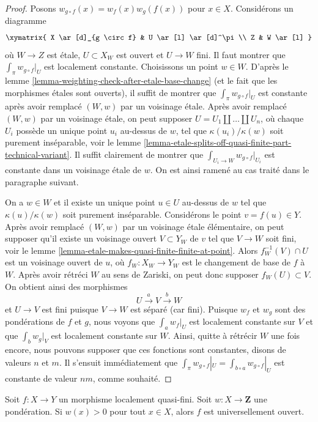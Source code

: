 \begin{proof}
Posons $w_{g \circ f}(x) = w_f(x) w_g(f(x))$ pour $x \in X$.
Considérons un diagramme
$$
\xymatrix{
X \ar[d]_{g \circ f} & U \ar[l] \ar[d]^\pi \\
Z & W \ar[l]
}
$$
où $W \to Z$ est \'etale, $U \subset X_W$ est ouvert et $U \to W$ fini.
Il faut montrer que $\int_\pi w_{g \circ f}|_U$ est localement constante.
Choisissons un point $w \in W$. D'après le
lemme \ref{lemma-weighting-check-after-etale-base-change}
(et le fait que les morphismes \'etales sont ouverts), il suffit de montrer que
$\int_\pi w_{g \circ f}|_U$ est constante après avoir remplacé
$(W, w)$ par un voisinage \'etale.
Après avoir remplacé $(W, w)$ par un voisinage \'etale, on peut
supposer $U = U_1 \amalg \ldots \amalg U_n$, où chaque $U_i$
possède un unique point $u_i$ au-dessus de $w$, tel que
$\kappa(u_i)/\kappa(w)$ soit purement inséparable, voir le
lemme \ref{lemma-etale-splits-off-quasi-finite-part-technical-variant}.
Il suffit clairement de montrer que $\int_{U_i \to W} w_{g \circ f}|_{U_i}$
est constante dans un voisinage \'etale de $w$.
On est ainsi ramené au cas traité dans le paragraphe suivant.

\medskip\noindent
On a $w \in W$ et il existe un unique point $u \in U$
au-dessus de $w$ tel que $\kappa(u)/\kappa(w)$ soit purement inséparable.
Considérons le point $v = f(u) \in Y$. Après avoir remplacé
$(W, w)$ par un voisinage \'etale élémentaire, on peut
supposer qu'il existe un voisinage ouvert $V \subset Y_W$
de $v$ tel que $V \to W$ soit fini, voir le
lemme \ref{lemma-etale-makes-quasi-finite-finite-at-point}.
Alors $f_W^{-1}(V) \cap U$ est un voisinage ouvert de $u$,
où $f_W : X_W \to Y_W$ est le changement de base de $f$ à $W$.
Après avoir rétréci $W$ au sens de Zariski, on peut donc supposer $f_W(U) \subset V$.
On obtient ainsi des morphismes
$$
U \xrightarrow{a} V \xrightarrow{b} W
$$
et $U \to V$ est fini puisque $V \to W$ est séparé (car fini).
Puisque $w_f$ et $w_g$ sont des pondérations de $f$ et $g$,
nous voyons que $\int_a w_f|_U$ est localement constante sur $V$ et que
$\int_b w_g|_V$ est localement constante sur $W$. Ainsi, quitte à rétrécir
$W$ une fois encore, nous pouvons supposer que ces fonctions sont constantes,
disons de valeurs $n$ et $m$. Il s'ensuit immédiatement que
$\int_\pi w_{g \circ f}|_U = \int_{b \circ a} w_{g \circ f}|_U$
est constante de valeur $nm$, comme souhaité.
\end{proof}

\begin{lemma}
\label{lemma-weighting-universally-open}
Soit $f : X \to Y$ un morphisme localement quasi-fini.
Soit $w : X \to \mathbf{Z}$ une pondération. Si $w(x) > 0$
pour tout $x \in X$, alors $f$ est universellement ouvert.
\end{lemma}


